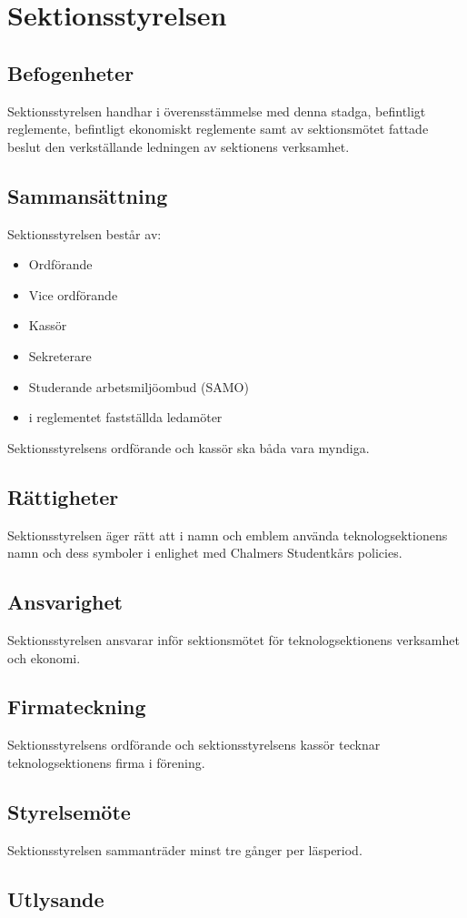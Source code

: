 \section{Sektionsstyrelsen}
\subsection{Befogenheter}
Sektionsstyrelsen handhar i överensstämmelse med denna stadga, befintligt reglemente, befintligt ekonomiskt reglemente samt av sektionsmötet fattade beslut den verkställande ledningen av sektionens verksamhet.
\subsection{Sammansättning}
Sektionsstyrelsen består av:
\begin{itemize}
\item Ordförande
\item Vice ordförande
\item Kassör
\item Sekreterare
\item Studerande arbetsmiljöombud (SAMO)
\item i reglementet fastställda ledamöter
\end{itemize}
Sektionsstyrelsens ordförande och kassör ska båda vara myndiga.
\subsection{Rättigheter}
Sektionsstyrelsen äger rätt att i namn och emblem använda teknologsektionens namn och dess symboler i enlighet med Chalmers Studentkårs policies.
\subsection{Ansvarighet}
Sektionsstyrelsen ansvarar inför sektionsmötet för teknologsektionens verksamhet och ekonomi.
\subsection{Firmateckning}
Sektionsstyrelsens ordförande och sektionsstyrelsens kassör tecknar teknologsektionens firma i förening.
\subsection{Styrelsemöte}
Sektionsstyrelsen sammanträder minst tre gånger per läsperiod.
\subsection{Utlysande}
